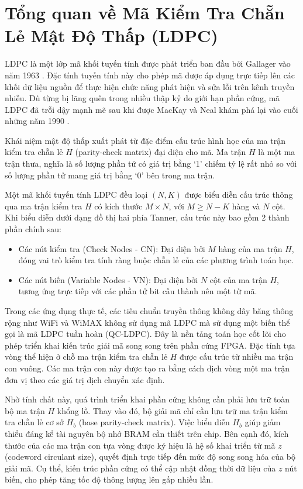 \documentclass[12pt,a4paper,oneside]{book}
\begin{document}
\section{Tổng quan về Mã Kiểm Tra Chẵn Lẻ Mật Độ Thấp (LDPC)}
LDPC là một lớp mã khối tuyến tính được phát triển ban đầu bởi Gallager vào năm 1963 \cite{5}. Đặc tính tuyến tính này cho phép mã được áp dụng trực tiếp lên các khối dữ liệu nguồn để thực hiện chức năng phát hiện và sửa lỗi trên kênh truyền nhiễu. Dù từng bị lãng quên trong nhiều thập kỷ do giới hạn phần cứng, mã LDPC đã trỗi dậy mạnh mẽ sau khi được MacKay và Neal khám phá lại vào cuối những năm 1990 \cite{6}.

Khái niệm mật độ thấp xuất phát từ đặc điểm cấu trúc hình học của ma trận kiểm tra chẵn lẻ $H$ (parity-check matrix) đại diện cho mã. Ma trận $H$ là một ma trận thưa, nghĩa là số lượng phần tử có giá trị bằng `1' chiếm tỷ lệ rất nhỏ so với số lượng phần tử mang giá trị bằng `0' bên trong ma trận. 

Một mã khối tuyến tính LDPC đều loại $(N, K)$ được biểu diễn cấu trúc thông qua ma trận kiểm tra $H$ có kích thước $M \times N$, với $M \ge N - K$ hàng và $N$ cột. Khi biểu diễn dưới dạng đồ thị hai phía Tanner, cấu trúc này bao gồm 2 thành phần chính sau:  
\begin{itemize}
    \item Các nút kiểm tra (Check Nodes - CN): Đại diện bởi $M$ hàng của ma trận $H$, đóng vai trò kiểm tra tính ràng buộc chẵn lẻ của các phương trình toán học.  
    \item Các nút biến (Variable Nodes - VN): Đại diện bởi $N$ cột của ma trận $H$, tương ứng trực tiếp với các phần tử bit cấu thành nên một từ mã. 
\end{itemize}

Trong các ứng dụng thực tế, các tiêu chuẩn truyền thông không dây băng thông rộng như WiFi và WiMAX không sử dụng mã LDPC mà sử dụng một biến thể gọi là mã LDPC tuần hoàn (QC-LDPC). Đây là nền tảng toán học cốt lõi cho phép triển khai kiến trúc giải mã song song trên phần cứng FPGA. Đặc tính tựa vòng thể hiện ở chỗ ma trận kiểm tra chẵn lẻ $H$ được cấu trúc từ nhiều ma trận con vuông. Các ma trận con này được tạo ra bằng cách dịch vòng một ma trận đơn vị theo các giá trị dịch chuyển xác định.

Nhờ tính chất này, quá trình triển khai phần cứng không cần phải lưu trữ toàn bộ ma trận $H$ khổng lồ. Thay vào đó, bộ giải mã chỉ cần lưu trữ ma trận kiểm tra chẵn lẻ cơ sở $H_b$ (base parity-check matrix). Việc biểu diễn $H_b$ giúp giảm thiểu đáng kể tài nguyên bộ nhớ BRAM cần thiết trên chip. Bên cạnh đó, kích thước của các ma trận con tựa vòng được ký hiệu là hệ số khai triển từ mã $z$ (codeword circulant size), quyết định trực tiếp đến mức độ song song hóa của bộ giải mã. Cụ thể, kiến trúc phần cứng có thể cập nhật đồng thời dữ liệu của $z$ nút biến, cho phép tăng tốc độ thông lượng lên gấp nhiều lần.
\end{document}
